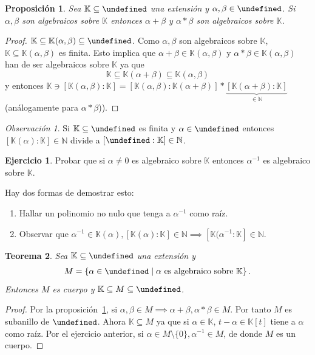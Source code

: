 \documentclass[10pt, spanish]{report}
\newtheorem{tma}{Teorema}[chapter]
\newtheorem{prop}[tma]{Proposición}
\theoremstyle{definition}
\theoremstyle{custom}
\newtheorem*{ejer}{Ejercicio}
\theoremstyle{remark}
\newtheorem*{obs}{Observación}
\newcommand{\N}{\mathbb{N}}
\newcommand{\K}{\mathbb{K}}
\let\L\undefined
\newcommand{\L}{\mathbb{L}}
\begin{document}
\begin{prop}\label{prop:operacionesalgebraicos}
    Sea $\K\subseteq\L$ una extensión y $\alpha,\beta\in\L$. Si $\alpha,\beta$
    son algebraicos sobre $\K$ entonces $\alpha+\beta$ y $\alpha*\beta$ son
    algebraicos sobre $\K$.
\end{prop}

\begin{proof}
    $\K\subseteq\K(\alpha,\beta)\subseteq\L$. Como $\alpha,\beta$ son
    algebraicos sobre $\K$, $\K\subseteq\K(\alpha,\beta)$ es finita. Esto
    implica que $\alpha+\beta\in\K(\alpha,\beta)$ y $\alpha*\beta\in
    \K(\alpha,\beta)$ han de ser algebraicos sobre $\K$ ya que
    \[\K\subseteq\K(\alpha+\beta)\subseteq\K(\alpha,\beta)\]
    y entonces $\K\ni[\K(\alpha,\beta):\K]=[\K(\alpha,\beta):\K(\alpha+\beta)]*
    \underbrace{[\K(\alpha+\beta):\K]}_{\in \N}$ (análogamente para
    $\alpha*\beta$)).
\end{proof}

\begin{obs}
    Si $\K\subseteq\L$ es finita y $\alpha\in\L$ entonces $[\K(\alpha):\K]\in
    \N$ divide a $[\L:\K]\in\N$.
\end{obs}

\begin{ejer}
    Probar que si $\alpha\neq 0$ es algebraico sobre $\K$ entonces $\alpha^{-1}$
    es algebraico sobre $\K$.
\end{ejer}

Hay dos formas de demostrar esto:
\begin{enumerate}
    \item Hallar un polinomio no nulo que tenga a $\alpha^{-1}$ como raíz.
    \item Observar que $\alpha^{-1}\in \K(\alpha),[\K(\alpha):\K]\in\N\implies
        [\K(\alpha^{-1}:\K]\in\N$.
\end{enumerate}

\begin{tma}\label{tma:extensionintermedia}
    Sea $\K\subseteq\L$ una extensión y \[M=\left\{ \alpha\in\L\mid\alpha\text{ es
    algebraico sobre }\K \right\}.\]
    Entonces $M$ es cuerpo y $\K\subseteq M\subseteq\L$.
\end{tma}

\begin{proof}
    Por la proposición~\ref{prop:operacionesalgebraicos}, si $\alpha,\beta\in
    M\implies\alpha+\beta,\alpha*\beta\in M$. Por tanto $M$ es subanillo de
    $\L$. Ahora $\K\subseteq M$ ya que si $\alpha\in\K$, $t-\alpha\in\K[t]$
    tiene a $\alpha$ como raíz. Por el ejercicio anterior, si $\alpha\in
    M\setminus\{0\}, \alpha^{-1}\in M$, de donde $M$ es un cuerpo.
\end{proof}
\end{document}
